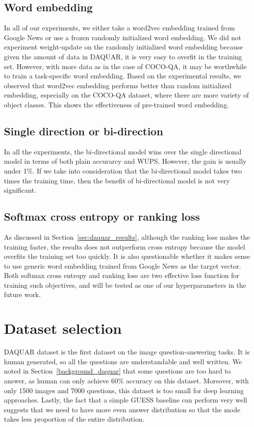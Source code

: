\subsection{Word embedding}
In all of our experiments, we either take a word2vec embedding trained from Google News \cite{mikolov13} or use a frozen randomly initialized word embedding. We did not experiment weight-update on the randomly initialized word embedding because given the amount of data in DAQUAR, it is very easy to overfit in the training set. However, with more data as in the case of COCO-QA, it may be worthwhile to train a task-specific word embedding. Based on the experimental results, we observed that word2vec embedding performs better than random initialized embedding, especially on the COCO-QA dataset, where there are more variety of object classes. This shows the effectiveness of pre-trained word embedding.

\subsection{Single direction or bi-direction}
In all the experiments, the bi-directional model wins over the single directional model in terms of both plain accurarcy and WUPS. However, the gain is usually under 1\%. If we take into consideration that the bi-directional model takes two times the training time, then the benefit of bi-directional model is not very significant. 

\subsection{Softmax cross entropy or ranking loss}
As discussed in Section~\ref{sec:daquar_results}, although the ranking loss makes the training faster, the results does not outperform cross entropy because the model overfits the training set too quickly. It is also questionable whether it makes sense to use generic word embedding trained from Google News as the target vector. Both softmax cross entropy and ranking loss are two effective loss function for training such objectives, and will be tested as one of our hyperparameters in the future work.

\section{Dataset selection}
DAQUAR dataset is the first dataset on the image question-answering tasks. It is human generated, so all the questions are understandable and well written. We noted in Section~\ref{background_daquar} that some questions are too hard to answer, as human can only achieve 60\% accuracy on this dataset. Moreover, with only 1500 images and 7000 questions, this dataset is too small for deep learning approaches. Lastly, the fact that a simple GUESS baseline can perform very well suggests that we need to have more even answer distribution so that the mode takes less proportion of the entire distribution.


